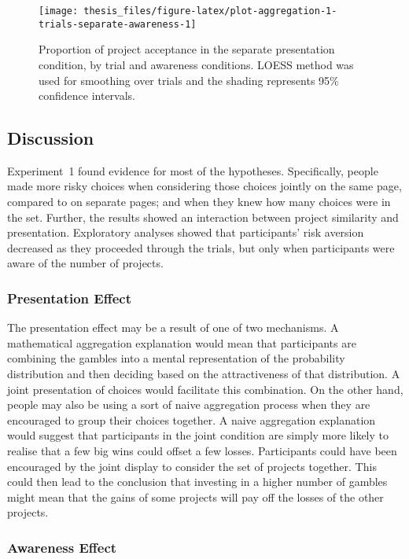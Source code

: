 \documentclass[a4paper, nobind]{templates/ociamthesis}
\theoremstyle{definition}
\theoremstyle{definition}
\theoremstyle{definition}
\theoremstyle{definition}
\theoremstyle{remark}
\begin{document}
\begin{figure}
\texttt{[image: thesis\_files/figure-latex/plot-aggregation-1-trials-separate-awareness-1]} \caption{Proportion of project acceptance in the separate presentation condition, by trial and awareness conditions. LOESS method was used for smoothing over trials and the shading represents 95\% confidence intervals.}\label{fig:plot-aggregation-1-trials-separate-awareness}
\end{figure}

\hypertarget{discussion-aggregation-1}{%
\subsection{Discussion}\label{discussion-aggregation-1}}

Experiment~1 found evidence for most of the hypotheses. Specifically, people
made more risky choices when considering those choices jointly on the same page,
compared to on separate pages; and when they knew how many choices were in the
set. Further, the results showed an interaction between project similarity and
presentation. Exploratory analyses showed that participants' risk aversion
decreased as they proceeded through the trials, but only when participants were
aware of the number of projects.

\subsubsection{Presentation Effect}

The presentation effect may be a result of one of two mechanisms. A mathematical
aggregation explanation would mean that participants are combining the gambles
into a mental representation of the probability distribution and then deciding
based on the attractiveness of that distribution. A joint presentation of
choices would facilitate this combination. On the other hand, people may also be
using a sort of naive aggregation process when they are encouraged to group
their choices together. A naive aggregation explanation would suggest that
participants in the joint condition are simply more likely to realise that a few
big wins could offset a few losses. Participants could have been encouraged by
the joint display to consider the set of projects together. This could then lead
to the conclusion that investing in a higher number of gambles might mean that
the gains of some projects will pay off the losses of the other projects.

\subsubsection{Awareness Effect}
\end{document}
